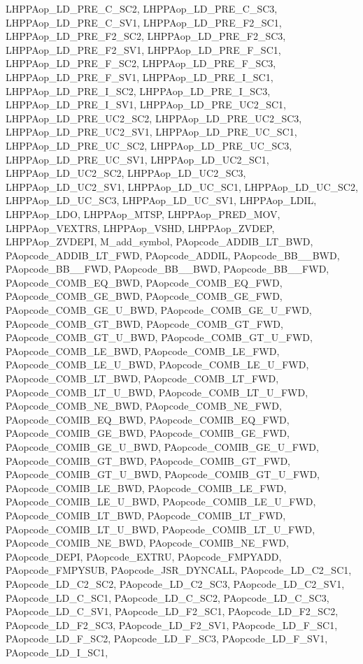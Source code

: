 LHPPAop\_\-LD\_\-PRE\_\-C\_\-SC2, LHPPAop\_\-LD\_\-PRE\_\-C\_\-SC3, LHPPAop\_\-LD\_\-PRE\_\-C\_\-SV1, LHPPAop\_\-LD\_\-PRE\_\-F2\_\-SC1, LHPPAop\_\-LD\_\-PRE\_\-F2\_\-SC2, LHPPAop\_\-LD\_\-PRE\_\-F2\_\-SC3, LHPPAop\_\-LD\_\-PRE\_\-F2\_\-SV1, LHPPAop\_\-LD\_\-PRE\_\-F\_\-SC1, LHPPAop\_\-LD\_\-PRE\_\-F\_\-SC2, LHPPAop\_\-LD\_\-PRE\_\-F\_\-SC3, LHPPAop\_\-LD\_\-PRE\_\-F\_\-SV1, LHPPAop\_\-LD\_\-PRE\_\-I\_\-SC1, LHPPAop\_\-LD\_\-PRE\_\-I\_\-SC2, LHPPAop\_\-LD\_\-PRE\_\-I\_\-SC3, LHPPAop\_\-LD\_\-PRE\_\-I\_\-SV1, LHPPAop\_\-LD\_\-PRE\_\-UC2\_\-SC1, LHPPAop\_\-LD\_\-PRE\_\-UC2\_\-SC2, LHPPAop\_\-LD\_\-PRE\_\-UC2\_\-SC3, LHPPAop\_\-LD\_\-PRE\_\-UC2\_\-SV1, LHPPAop\_\-LD\_\-PRE\_\-UC\_\-SC1, LHPPAop\_\-LD\_\-PRE\_\-UC\_\-SC2, LHPPAop\_\-LD\_\-PRE\_\-UC\_\-SC3, LHPPAop\_\-LD\_\-PRE\_\-UC\_\-SV1, LHPPAop\_\-LD\_\-UC2\_\-SC1, LHPPAop\_\-LD\_\-UC2\_\-SC2, LHPPAop\_\-LD\_\-UC2\_\-SC3, LHPPAop\_\-LD\_\-UC2\_\-SV1, LHPPAop\_\-LD\_\-UC\_\-SC1, LHPPAop\_\-LD\_\-UC\_\-SC2, LHPPAop\_\-LD\_\-UC\_\-SC3, LHPPAop\_\-LD\_\-UC\_\-SV1, LHPPAop\_\-LDIL, LHPPAop\_\-LDO, LHPPAop\_\-MTSP, LHPPAop\_\-PRED\_\-MOV, LHPPAop\_\-VEXTRS, LHPPAop\_\-VSHD, LHPPAop\_\-ZVDEP, LHPPAop\_\-ZVDEPI, M\_\-add\_\-symbol, PAopcode\_\-ADDIB\_\-LT\_\-BWD, PAopcode\_\-ADDIB\_\-LT\_\-FWD, PAopcode\_\-ADDIL, PAopcode\_\-BB\_\_\-BWD, PAopcode\_\-BB\_\_\-FWD, PAopcode\_\-BB\_\_\-BWD, PAopcode\_\-BB\_\_\-FWD, PAopcode\_\-COMB\_\-EQ\_\-BWD, PAopcode\_\-COMB\_\-EQ\_\-FWD, PAopcode\_\-COMB\_\-GE\_\-BWD, PAopcode\_\-COMB\_\-GE\_\-FWD, PAopcode\_\-COMB\_\-GE\_\-U\_\-BWD, PAopcode\_\-COMB\_\-GE\_\-U\_\-FWD, PAopcode\_\-COMB\_\-GT\_\-BWD, PAopcode\_\-COMB\_\-GT\_\-FWD, PAopcode\_\-COMB\_\-GT\_\-U\_\-BWD, PAopcode\_\-COMB\_\-GT\_\-U\_\-FWD, PAopcode\_\-COMB\_\-LE\_\-BWD, PAopcode\_\-COMB\_\-LE\_\-FWD, PAopcode\_\-COMB\_\-LE\_\-U\_\-BWD, PAopcode\_\-COMB\_\-LE\_\-U\_\-FWD, PAopcode\_\-COMB\_\-LT\_\-BWD, PAopcode\_\-COMB\_\-LT\_\-FWD, PAopcode\_\-COMB\_\-LT\_\-U\_\-BWD, PAopcode\_\-COMB\_\-LT\_\-U\_\-FWD, PAopcode\_\-COMB\_\-NE\_\-BWD, PAopcode\_\-COMB\_\-NE\_\-FWD, PAopcode\_\-COMIB\_\-EQ\_\-BWD, PAopcode\_\-COMIB\_\-EQ\_\-FWD, PAopcode\_\-COMIB\_\-GE\_\-BWD, PAopcode\_\-COMIB\_\-GE\_\-FWD, PAopcode\_\-COMIB\_\-GE\_\-U\_\-BWD, PAopcode\_\-COMIB\_\-GE\_\-U\_\-FWD, PAopcode\_\-COMIB\_\-GT\_\-BWD, PAopcode\_\-COMIB\_\-GT\_\-FWD, PAopcode\_\-COMIB\_\-GT\_\-U\_\-BWD, PAopcode\_\-COMIB\_\-GT\_\-U\_\-FWD, PAopcode\_\-COMIB\_\-LE\_\-BWD, PAopcode\_\-COMIB\_\-LE\_\-FWD, PAopcode\_\-COMIB\_\-LE\_\-U\_\-BWD, PAopcode\_\-COMIB\_\-LE\_\-U\_\-FWD, PAopcode\_\-COMIB\_\-LT\_\-BWD, PAopcode\_\-COMIB\_\-LT\_\-FWD, PAopcode\_\-COMIB\_\-LT\_\-U\_\-BWD, PAopcode\_\-COMIB\_\-LT\_\-U\_\-FWD, PAopcode\_\-COMIB\_\-NE\_\-BWD, PAopcode\_\-COMIB\_\-NE\_\-FWD, PAopcode\_\-DEPI, PAopcode\_\-EXTRU, PAopcode\_\-FMPYADD, PAopcode\_\-FMPYSUB, PAopcode\_\-JSR\_\-DYNCALL, PAopcode\_\-LD\_\-C2\_\-SC1, PAopcode\_\-LD\_\-C2\_\-SC2, PAopcode\_\-LD\_\-C2\_\-SC3, PAopcode\_\-LD\_\-C2\_\-SV1, PAopcode\_\-LD\_\-C\_\-SC1, PAopcode\_\-LD\_\-C\_\-SC2, PAopcode\_\-LD\_\-C\_\-SC3, PAopcode\_\-LD\_\-C\_\-SV1, PAopcode\_\-LD\_\-F2\_\-SC1, PAopcode\_\-LD\_\-F2\_\-SC2, PAopcode\_\-LD\_\-F2\_\-SC3, PAopcode\_\-LD\_\-F2\_\-SV1, PAopcode\_\-LD\_\-F\_\-SC1, PAopcode\_\-LD\_\-F\_\-SC2, PAopcode\_\-LD\_\-F\_\-SC3, PAopcode\_\-LD\_\-F\_\-SV1, PAopcode\_\-LD\_\-I\_\-SC1, 